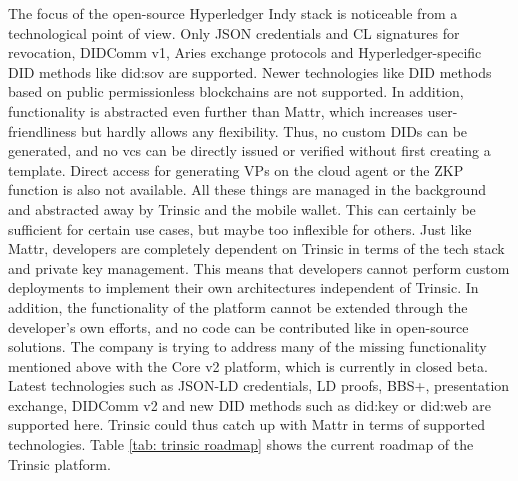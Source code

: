             The focus of the open-source Hyperledger Indy stack is noticeable from a technological point of view. Only JSON credentials and \ac{CL} signatures for revocation, DIDComm v1, Aries exchange protocols and Hyperledger-specific \ac{DID} methods like did:sov are supported. Newer technologies like \ac{DID} methods based on public permissionless blockchains are not supported. In addition, functionality is abstracted even further than Mattr, which increases user-friendliness but hardly allows any flexibility. Thus, no custom \acp{DID} can be generated, and no \acp{vc} can be directly issued or verified without first creating a template. Direct access for generating \acp{VP} on the cloud agent or the \ac{ZKP} function is also not available. All these things are managed in the background and abstracted away by Trinsic and the mobile wallet. This can certainly be sufficient for certain use cases, but maybe too inflexible for others. Just like Mattr, developers are completely dependent on Trinsic in terms of the tech stack and private key management. This means that developers cannot perform custom deployments to implement their own architectures independent of Trinsic. In addition, the functionality of the platform cannot be extended through the developer's own efforts, and no code can be contributed like in open-source solutions. The company is trying to address many of the missing functionality mentioned above with the Core v2 platform, which is currently in closed beta. Latest technologies such as JSON-LD credentials, LD proofs, BBS+, presentation exchange, DIDComm v2 and new \ac{DID} methods such as did:key or did:web are supported here. Trinsic could thus catch up with Mattr in terms of supported technologies. Table \ref{tab: trinsic roadmap} shows the current roadmap of the Trinsic platform. 
            \newline
    

